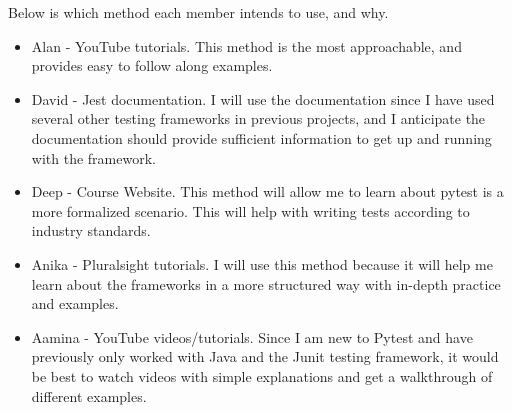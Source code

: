 \documentclass[12pt, titlepage]{article}
\begin{document}
Below is which method each member intends to use, and why.
\begin{itemize}
\item Alan - YouTube tutorials. This method is the most approachable, and provides easy to follow along examples.
\item David - Jest documentation. I will use the documentation since I have used several other testing frameworks in previous projects, and I anticipate the documentation should provide sufficient information to get up and running with the framework.
\item Deep - Course Website. This method will allow me to learn about pytest is a more formalized scenario. This will help with writing tests according to industry standards.
\item Anika - Pluralsight tutorials. I will use this method because it will help me learn about the frameworks in a more structured way with in-depth practice and examples.
\item Aamina - YouTube videos/tutorials. Since I am new to Pytest and have previously only worked with Java and the Junit testing framework, it would be best to watch videos with simple explanations and get a walkthrough of different examples.
\end{itemize}
\end{document}
